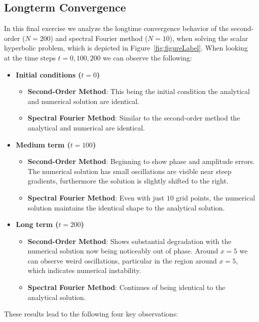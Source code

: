 \subsection{Longterm Convergence}
In this final exercise we analyze the longtime convergence behavior of the second-order ($N=200$) and spectral Fourier method ($N=10$), when solving the scalar hyperbolic problem, which is depicted in Figure~\ref{fig:figureLabel}. When looking at the time steps $t=0, 100, 200$ we can observe the following:
\begin{itemize}
	\item \textbf{Initial conditions ($t=0$)}
	      \begin{itemize}
		      \item \textbf{Second-Order Method}: This being the initial condition the analytical and numerical solution are identical.
		      \item \textbf{Spectral Fourier Method}: Similar to the second-order method the analytical and numerical are identical.
	      \end{itemize}
	\item \textbf{Medium term ($t=100$)}
	      \begin{itemize}
		      \item \textbf{Second-Order Method}: Beginning to show phase and amplitude errors. The numerical solution has small oscillations are visible near steep gradients, furthermore  the solution is slightly shifted to the right.
		      \item \textbf{Spectral Fourier Method}: Even with just $10$ grid points, the numerical solution maintains the identical shape to the analytical solution.
	      \end{itemize}

	\item \textbf{Long term ($t=200$)}
	      \begin{itemize}
		      \item \textbf{Second-Order Method}: Shows substantial degradation with the numerical solution now being noticeably out of phase. Around $x=5$ we can observe weird oscillations, particular in the region around $x=5$, which indicates numerical instability.
		      \item \textbf{Spectral Fourier Method}: Continues of being identical to the analytical solution.
	      \end{itemize}
\end{itemize}
These results lead to the following four key observations:
